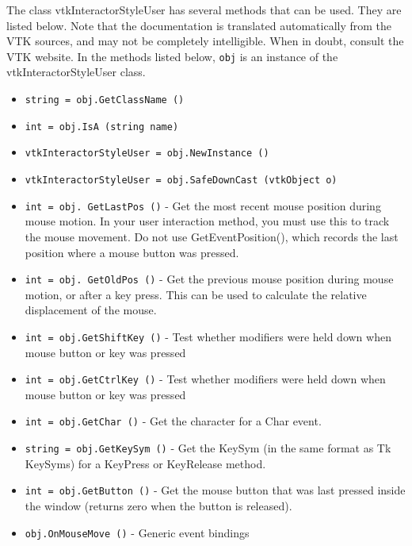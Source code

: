 The class vtkInteractorStyleUser has several methods that can be used.
  They are listed below.
Note that the documentation is translated automatically from the VTK sources,
and may not be completely intelligible.  When in doubt, consult the VTK website.
In the methods listed below, \verb|obj| is an instance of the vtkInteractorStyleUser class.
\begin{itemize}
\item  \verb|string = obj.GetClassName ()|

\item  \verb|int = obj.IsA (string name)|

\item  \verb|vtkInteractorStyleUser = obj.NewInstance ()|

\item  \verb|vtkInteractorStyleUser = obj.SafeDownCast (vtkObject o)|

\item  \verb|int = obj. GetLastPos ()| -  Get the most recent mouse position during mouse motion.  
 In your user interaction method, you must use this to track
 the mouse movement.  Do not use GetEventPosition(), which records
 the last position where a mouse button was pressed.

\item  \verb|int = obj. GetOldPos ()| -  Get the previous mouse position during mouse motion, or after
 a key press.  This can be used to calculate the relative 
 displacement of the mouse.

\item  \verb|int = obj.GetShiftKey ()| -  Test whether modifiers were held down when mouse button or key
 was pressed

\item  \verb|int = obj.GetCtrlKey ()| -  Test whether modifiers were held down when mouse button or key
 was pressed

\item  \verb|int = obj.GetChar ()| -  Get the character for a Char event.

\item  \verb|string = obj.GetKeySym ()| -  Get the KeySym (in the same format as Tk KeySyms) for a 
 KeyPress or KeyRelease method.

\item  \verb|int = obj.GetButton ()| -  Get the mouse button that was last pressed inside the window
 (returns zero when the button is released).

\item  \verb|obj.OnMouseMove ()| -  Generic event bindings


\end{itemize}
